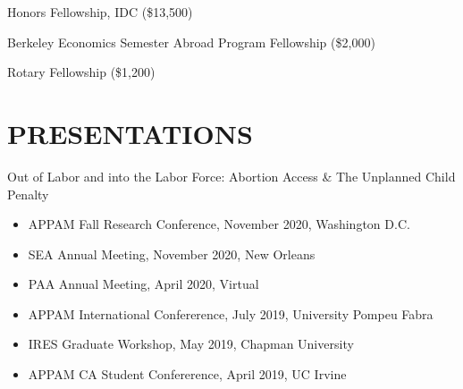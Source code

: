 \documentclass[margin]{res} %
\begin{document}
\begin{resume}
Honors Fellowship, IDC (\$13,500) 

Berkeley Economics Semester Abroad Program Fellowship (\$2,000) 

Rotary Fellowship (\$1,200) 

 
\section{PRESENTATIONS} 
\vspace{5mm} 
Out of Labor and into the Labor Force: Abortion Access \& The Unplanned Child Penalty
\begin{itemize}
	\item APPAM Fall Research Conference, November 2020, Washington D.C.
	\item SEA Annual Meeting, November 2020, New Orleans
	\item PAA Annual Meeting, April 2020, Virtual
	\item APPAM International Confererence, July 2019, University Pompeu Fabra
	\item IRES Graduate Workshop, May 2019, Chapman University
	\item APPAM CA Student Confererence, April 2019, UC Irvine
\end{itemize}

 
 \begin{comment}
\section{APPLICABLE GRADUATE COURSEWORK}

Labor Economics \hfill Spring 2017

Quantitative Methods For Empirical Work \hfill Fall 2017

Intermediate Econometrics I - III \hfill Fall 2015 - Spring 2016

Public Economics I - II \hfill  Fall 2016 - Winter 2017
\end{comment}


\end{resume}
\end{document}
